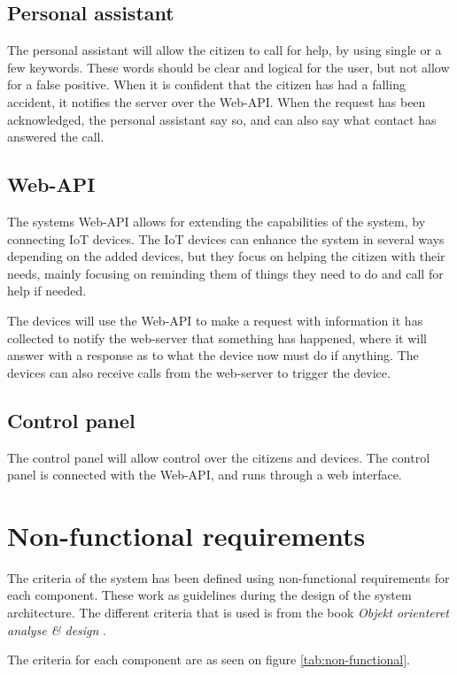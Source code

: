 \subsection{Personal assistant}
The personal assistant will allow the citizen to call for help, by using single or a few keywords. These words should be clear and logical for the user, but not allow for a false positive. When it is confident that the citizen has had a falling accident, it notifies the server over the Web-API. When the request has been acknowledged, the personal assistant say so, and can also say what contact has answered the call.

\subsection{Web-API}
The systems Web-API allows for extending the capabilities of the system, by connecting IoT devices. The IoT devices can enhance the system in several ways depending on the added devices, but they focus on helping the citizen with their needs, mainly focusing on reminding them of things they need to do and call for help if needed. 

The devices will use the Web-API to make a request with information it has collected to notify the web-server that something has happened, where it will answer with a response as to what the device now must do if anything. The devices can also receive calls from the web-server to trigger the device.


\subsection{Control panel}
The control panel will allow control over the citizens and devices. The control panel is connected with the Web-API, and runs through a web interface. 


\section{Non-functional requirements}
The criteria of the system has been defined using non-functional requirements for each component. These work as guidelines during the design of the system architecture. The different criteria that is used is from the book \textit{Objekt orienteret analyse \& design} \cite{subook}.

The criteria for each component are as seen on figure \ref{tab:non-functional}.



